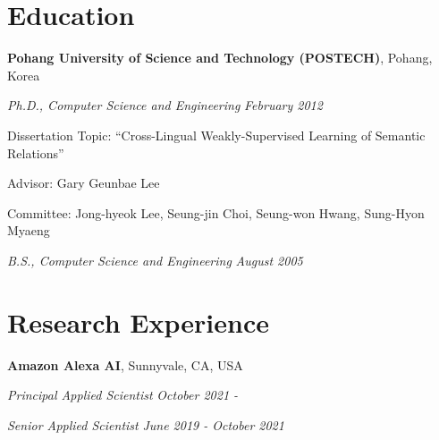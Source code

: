 \documentclass[margin,line]{res}
\newenvironment{list1}{
  \begin{list}{\ding{113}}{%
      \setlength{\itemsep}{0in}
      \setlength{\parsep}{0in} \setlength{\parskip}{0in}
      \setlength{\topsep}{0in} \setlength{\partopsep}{0in}
      \setlength{\leftmargin}{0.17in}}}{\end{list}}
\begin{document}
\begin{resume}
\section{\sc Education}
{\bf Pohang University of Science and Technology (POSTECH)}, Pohang, Korea\\
\vspace*{-.3cm}
\begin{list1}
\item[] {\em Ph.D., Computer Science and Engineering} \hfill {\em February 2012}\\
  \vspace*{-.3cm}
  \begin{list1}
  \item [] Dissertation Topic:  ``Cross-Lingual Weakly-Supervised Learning of Semantic Relations''
  \item [] Advisor:  Gary Geunbae Lee
  \item [] Committee: Jong-hyeok Lee, Seung-jin Choi, Seung-won Hwang, Sung-Hyon Myaeng
  \end{list1}
  \vspace*{.3cm}
\item[] {\em B.S., Computer Science and Engineering} \hfill {\em August 2005}\\
  \vspace*{-.3cm}
\end{list1}

\section{\sc Research Experience}
{\bf Amazon Alexa AI}, Sunnyvale, CA, USA\\
\vspace{-.3cm}
\begin{list1}
\item[] {\em Principal Applied Scientist} \hfill {\em October 2021 -}\\
  \vspace{-.3cm}  
\item[] {\em Senior Applied Scientist} \hfill {\em June 2019 - October 2021}\\
  \vspace{-.3cm}
\end{list1}


\end{resume}
\end{document}
